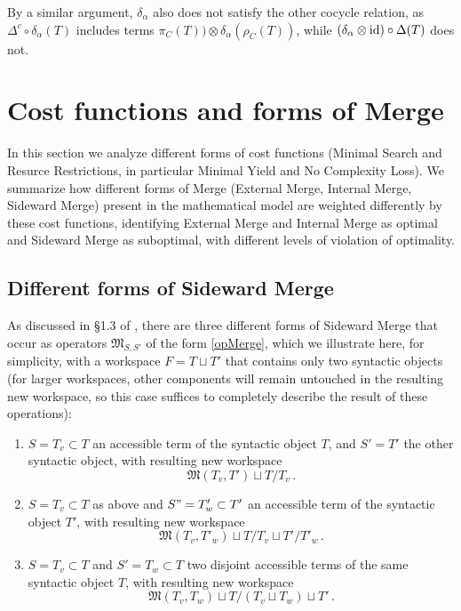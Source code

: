 \documentclass[12pt]{amsart}
\numberwithin{equation}{section}
\def\fM{{\mathfrak M}}
\begin{document}
By a similar argument, $\delta_\alpha$ also does not satisfy the other cocycle
relation, as $\Delta^c \circ \delta_\alpha (T)$ includes 
terms $\pi_C(T)) \otimes \delta_\alpha(\rho_C(T))$, while $(\delta_\alpha\otimes {\rm id})\circ \Delta(T)$
does not. 


\endproof

\section{Cost functions and forms of Merge}\label{CostsSec}

In this section we analyze different forms of cost functions (Minimal Search and 
Resurce Restrictions, in particular Minimal Yield and No Complexity Loss).
We summarize how different forms of Merge (External Merge, Internal Merge,
Sideward Merge) present in the mathematical model are weighted differently
by these cost functions, identifying External Merge and Internal Merge as
optimal and Sideward Merge as suboptimal, with different levels of violation
of optimality. 

\smallskip
\subsection{Different forms of Sideward Merge} \label{typesSMsec}

As discussed in \S 1.3 of \cite{MCB}, there are three different forms of
Sideward Merge that occur as operators $\fM_{S,S'}$ of the form \eqref{opMerge},
which we illustrate here, for simplicity, with a workspace $F=T\sqcup T'$ that
contains only two syntactic objects (for larger workspaces, other components
will remain untouched in the resulting new workspace, so this case suffices to
completely describe the result of these operations):
\begin{enumerate}
\item $S=T_v\subset T$ an accessible term of the syntactic object $T$, and $S'=T'$ 
the other syntactic object, with resulting new workspace
$$ \fM(T_v, T') \sqcup T/T_v\, . $$
\item $S=T_v\subset T$ as above and $S"=T'_w\subset T'$ an accessible term of the syntactic object $T'$, 
with resulting new workspace
$$ \fM(T_v, T'_w) \sqcup T/T_v \sqcup T'/T'_w \, . $$
\item $S=T_v\subset T$ and $S'=T_w \subset T$ two disjoint accessible terms of the same
syntactic object $T$, with resulting new workspace
$$ \fM(T_v, T_w) \sqcup T/(T_v \sqcup T_w) \sqcup T' \, . $$
\end{enumerate}
\end{document}
